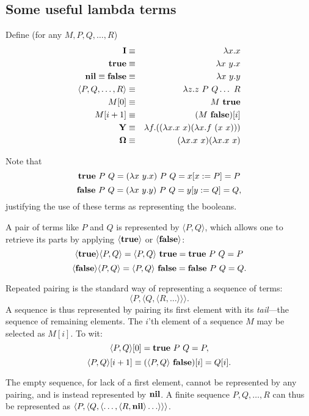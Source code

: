 \documentclass{article}
\newcommand{\tup}[1]{\langle #1 \rangle}
\newcommand{\idx}[2]{#1[#2]}
\newcommand{\Ct}{{\bf true}}
\newcommand{\Cf}{{\bf false}}
\newcommand{\CY}{{\bf Y}}
\newcommand{\CI}{{\bf I}}
\newcommand{\COm}{{\bf \Omega}}
\newcommand{\Cnil}{{\bf nil}}
\newcommand{\Csucc}{{\bf succ}}
\newcommand{\Cnull}{{\bf null}}
\begin{document}
\subsection{Some useful lambda terms}
Define (for any $M,P,Q,\ldots,R$)
\begin{eqnarray*}
\CI & \equiv & \lambda x.x \\
\Ct & \equiv & \lambda x\ y. x \\
\Cnil \equiv \Cf & \equiv & \lambda x\ y. y \\
\tup{P,Q,\ldots,R} & \equiv & \lambda z.z\ P\ Q \ldots\ R \\
\idx{M}{0} & \equiv & M\ \Ct \\
\idx{M}{i+1} & \equiv & \idx{(M\ \Cf)}{i} \\
\CY & \equiv & \lambda f.((\lambda x.x\ x)(\lambda x.f\ (x\ x))) \\
\COm & \equiv & (\lambda x.x\ x)(\lambda x.x\ x)
\end{eqnarray*}

Note that
\[ \Ct\ P\ Q = (\lambda x\ y.x)\ P\ Q = x[x:=P] = P \]
\[ \Cf\ P\ Q = (\lambda x\ y.y)\ P\ Q = y[y:=Q] = Q, \]
justifying the use of these terms as representing the booleans.

A pair of terms like $P$ and $Q$ is represented by $\tup{P,Q}$, which
allows one to retrieve its parts by applying $\tup{\Ct}$ or $\tup{\Cf}$:
\[ \tup{\Ct} \tup{P,Q} = \tup{P,Q}\ \Ct = \Ct\ P\ Q = P\]
\[ \tup{\Cf} \tup{P,Q} = \tup{P,Q}\ \Cf = \Cf\ P\ Q = Q.\]

Repeated pairing is the standard way of representing a sequence
of terms: \[\tup{P,\tup{Q,\tup{R,\ldots}}}.\]
A sequence is thus represented by pairing its first element
with its {\em tail}---the sequence of remaining elements.
The $i$'th element of a sequence $M$ may be selected as
$\idx{M}{i}$. To wit:
\[ \idx{\tup{P,Q}}{0} = \Ct\ P\ Q = P, \]
\[ \idx{\tup{P,Q}}{i+1} \equiv \idx{(\tup{P,Q}\ \Cf)}{i} = \idx{Q}{i}. \]

The empty sequence, for lack of a first element, cannot be
represented by any pairing, and is instead represented by $\Cnil$.
A finite sequence $P,Q,\ldots, R$ can thus be represented as
$\tup{P,\tup{Q,\tup{\ldots,\tup{R,\Cnil}\ldots}}}$.
\end{document}

